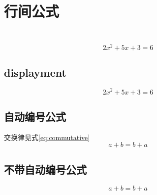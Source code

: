 \documentclass{article}
\begin{document}
	\section{行间公式}
	\subsection{$$$$}
	        $$2x^2+5x+3=6$$	
	\subsection{displayment}
	\begin{displaymath}
		2x^2+5x+3=6	
	\end{displaymath}
	\subsection{自动编号公式}
	交换律见式\ref{eq:commutative}
	\begin{equation}
		a+b=b+a \label{eq:commutative}
	\end{equation}
    \subsection{不带自动编号公式}
    \begin{equation*}%
    	a+b=b+a
    \end{equation*}
	
\end{document}
